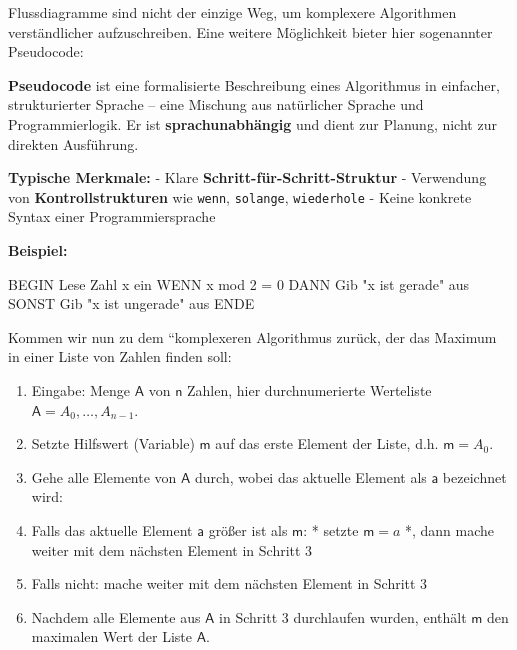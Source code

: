 \documentclass[
  letterpaper,
  DIV=11,
  numbers=noendperiod]{scrreprt}
\newenvironment{Shaded}{\begin{snugshade}}{\end{snugshade}}
\newcommand{\NormalTok}[1]{\textcolor[rgb]{0.00,0.23,0.31}{#1}}
\providecommand{\tightlist}{%
  \setlength{\itemsep}{0pt}\setlength{\parskip}{0pt}}\usepackage{longtable,booktabs,array}
\begin{document}
Flussdiagramme sind nicht der einzige Weg, um komplexere Algorithmen
verständlicher aufzuschreiben. Eine weitere Möglichkeit bieter hier
sogenannter Pseudocode:

\begin{tcolorbox}[enhanced jigsaw, bottomtitle=1mm, colbacktitle=quarto-callout-note-color!10!white, colback=white, opacityback=0, arc=.35mm, left=2mm, toprule=.15mm, title=\textcolor{quarto-callout-note-color}{\faInfo}\hspace{0.5em}{Pseudocode -- Vom Gedanken zum Programm}, coltitle=black, toptitle=1mm, leftrule=.75mm, opacitybacktitle=0.6, breakable, titlerule=0mm, rightrule=.15mm, bottomrule=.15mm, colframe=quarto-callout-note-color-frame]

\textbf{Pseudocode} ist eine formalisierte Beschreibung eines
Algorithmus in einfacher, strukturierter Sprache -- eine Mischung aus
natürlicher Sprache und Programmierlogik. Er ist
\textbf{sprachunabhängig} und dient zur Planung, nicht zur direkten
Ausführung.

\textbf{Typische Merkmale:} - Klare
\textbf{Schritt-für-Schritt-Struktur} - Verwendung von
\textbf{Kontrollstrukturen} wie \texttt{wenn}, \texttt{solange},
\texttt{wiederhole} - Keine konkrete Syntax einer Programmiersprache

\textbf{Beispiel:}

\begin{Shaded}
\begin{Highlighting}[]
\NormalTok{BEGIN}
\NormalTok{  Lese Zahl x ein}
\NormalTok{  WENN x mod 2 = 0 DANN}
\NormalTok{    Gib "x ist gerade" aus}
\NormalTok{  SONST}
\NormalTok{    Gib "x ist ungerade" aus}
\NormalTok{ENDE}
\end{Highlighting}
\end{Shaded}

\end{tcolorbox}

Kommen wir nun zu dem ``komplexeren Algorithmus zurück, der das Maximum
in einer Liste von Zahlen finden soll:

\begin{enumerate}
\def\labelenumi{\arabic{enumi}.}
\tightlist
\item
  Eingabe: Menge \(\mathsf A\) von \(\mathsf n\) Zahlen, hier
  durchnumerierte Werteliste \(\mathsf A=A_0, \dots, A_{n-1}\).
\item
  Setzte Hilfswert (Variable) \(\mathsf m\) auf das erste Element der
  Liste, d.h. \(\mathsf m = A_0\).
\item
  Gehe alle Elemente von \(\mathsf A\) durch, wobei das aktuelle Element
  als \(\mathsf a\) bezeichnet wird:
\item
  Falls das aktuelle Element \(\mathsf a\) größer ist als \(\mathsf m\):
  * setzte \(\mathsf m = a\) *, dann mache weiter mit dem nächsten
  Element in Schritt 3
\item
  Falls nicht: mache weiter mit dem nächsten Element in Schritt 3
\item
  Nachdem alle Elemente aus \(\mathsf A\) in Schritt 3 durchlaufen
  wurden, enthält \(\mathsf m\) den maximalen Wert der Liste
  \(\mathsf A\).
\end{enumerate}
\end{document}
